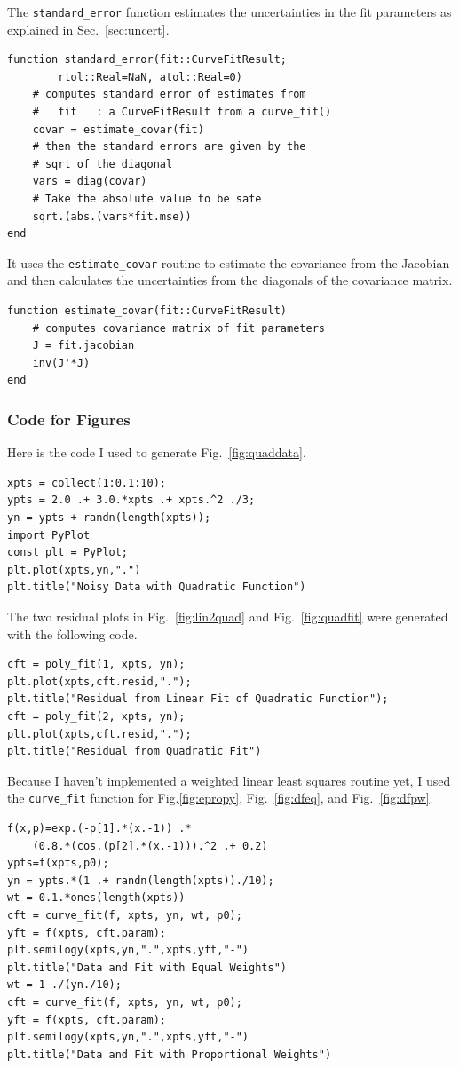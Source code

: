 \documentclass{scrartcl}
\begin{document}
The \texttt{standard\_error} function estimates the uncertainties
in the fit parameters as explained in Sec.~\ref{sec:uncert}.
\begin{lstlisting}
function standard_error(fit::CurveFitResult;
		rtol::Real=NaN, atol::Real=0)
    # computes standard error of estimates from
    #   fit   : a CurveFitResult from a curve_fit()
    covar = estimate_covar(fit)
    # then the standard errors are given by the
    # sqrt of the diagonal
    vars = diag(covar)
    # Take the absolute value to be safe
    sqrt.(abs.(vars*fit.mse))
end
\end{lstlisting}
It uses the \texttt{estimate\_covar} routine to
estimate the covariance from the Jacobian and then
calculates the uncertainties from the diagonals of
the covariance matrix.
\begin{lstlisting}
function estimate_covar(fit::CurveFitResult)
    # computes covariance matrix of fit parameters
    J = fit.jacobian
    inv(J'*J)
end
\end{lstlisting}

\subsubsection{Code for Figures}
Here is the code I used to generate Fig.~\ref{fig:quaddata}.
\begin{lstlisting}
xpts = collect(1:0.1:10);
ypts = 2.0 .+ 3.0.*xpts .+ xpts.^2 ./3;
yn = ypts + randn(length(xpts));
import PyPlot
const plt = PyPlot;
plt.plot(xpts,yn,".")
plt.title("Noisy Data with Quadratic Function")
\end{lstlisting}
The two residual plots in Fig.~\ref{fig:lin2quad} and
Fig.~\ref{fig:quadfit} were generated with the following
code.
\begin{lstlisting}
cft = poly_fit(1, xpts, yn);
plt.plot(xpts,cft.resid,".");
plt.title("Residual from Linear Fit of Quadratic Function");
cft = poly_fit(2, xpts, yn);
plt.plot(xpts,cft.resid,".");
plt.title("Residual from Quadratic Fit")
\end{lstlisting}
Because I haven't implemented a weighted linear least squares
routine yet, I used the \texttt{curve\_fit} function for
Fig.\ref{fig:epropy}, Fig.~\ref{fig:dfeq}, and Fig.~\ref{fig:dfpw}.
\begin{lstlisting}
f(x,p)=exp.(-p[1].*(x.-1)) .*
	(0.8.*(cos.(p[2].*(x.-1))).^2 .+ 0.2)
ypts=f(xpts,p0);
yn = ypts.*(1 .+ randn(length(xpts))./10);
wt = 0.1.*ones(length(xpts))
cft = curve_fit(f, xpts, yn, wt, p0);
yft = f(xpts, cft.param);
plt.semilogy(xpts,yn,".",xpts,yft,"-")
plt.title("Data and Fit with Equal Weights")
wt = 1 ./(yn./10);
cft = curve_fit(f, xpts, yn, wt, p0);
yft = f(xpts, cft.param);
plt.semilogy(xpts,yn,".",xpts,yft,"-")
plt.title("Data and Fit with Proportional Weights")
\end{lstlisting}
\end{document}
